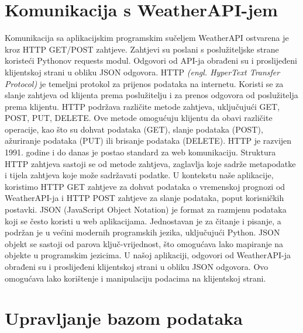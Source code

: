 \documentclass[times, utf8, zavrsni]{fer}
\begin{document}
\section{Komunikacija s WeatherAPI-jem}

Komunikacija sa aplikacijskim programskim sučeljem WeatherAPI ostvarena je kroz HTTP GET/POST zahtjeve. Zahtjevi su poslani s poslužiteljske strane koristeći Pythonov requests modul. Odgovori od API-ja obrađeni su i proslijeđeni klijentskoj strani u obliku JSON odgovora. HTTP \textit{(engl. HyperText Transfer Protocol)} je temeljni protokol za prijenos podataka na internetu. Koristi se za slanje zahtjeva od klijenta prema poslužitelju i za prenos odgovora od poslužitelja prema klijentu. HTTP podržava različite metode zahtjeva, uključujući GET, POST, PUT, DELETE. Ove metode omogućuju klijentu da obavi različite operacije, kao što su dohvat podataka (GET), slanje podataka (POST), ažuriranje podataka (PUT) ili brisanje podataka (DELETE). HTTP je razvijen 1991. godine i do danas je postao standard za web komunikaciju. Struktura HTTP zahtjeva sastoji se od metode zahtjeva, zaglavlja koje sadrže metapodatke i tijela zahtjeva koje može sadržavati podatke. U kontekstu naše aplikacije, koristimo HTTP GET zahtjeve za dohvat podataka o vremenskoj prognozi od WeatherAPI-ja i HTTP POST zahtjeve za slanje podataka, poput korisničkih postavki. JSON (JavaScript Object Notation) je format za razmjenu podataka koji se često koristi u web aplikacijama. Jednostavan je za čitanje i pisanje, a podržan je u većini modernih programskih jezika, uključujući Python. JSON objekt se sastoji od parova ključ-vrijednost, što omogućava lako mapiranje na objekte u programskim jezicima. U našoj aplikaciji, odgovori od WeatherAPI-ja obrađeni su i proslijeđeni klijentskoj strani u obliku JSON odgovora. Ovo omogućava lako korištenje i manipulaciju podacima na klijentskoj strani.

\section{Upravljanje bazom podataka}
\end{document}
